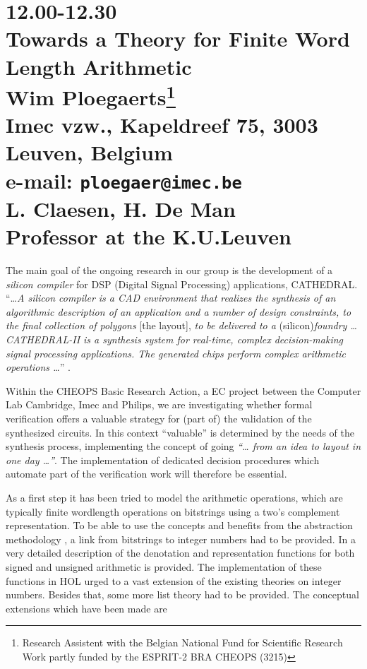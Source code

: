 \newpage
\section*{12.00-12.30\\
Towards a Theory for Finite Word Length Arithmetic\\
Wim Ploegaerts\footnote{Research Assistent with the Belgian National Fund for  
            Scientific Research
            \newline Work partly funded by the ESPRIT-2 BRA CHEOPS (3215)}\\
{\large\bf Imec vzw., Kapeldreef 75, 3003 Leuven, Belgium} \\
{\normalsize\bf e-mail: {\tt ploegaer@imec.be }}\\     
L. Claesen, H. De Man\\
\large\bf Professor at the K.U.Leuven}



The main goal of the ongoing research in our group is the development
of a {\em silicon compiler} for DSP (Digital Signal Processing) applications,
CATHEDRAL.
``\ldots {\em A silicon compiler is a 
CAD environment that realizes the synthesis
of an algorithmic description of an application and a number of design
constraints, to the final collection of polygons} [the layout], {\em to be
delivered to a} (silicon){\em  foundry \ldots CATHEDRAL-II is a synthesis
system for real-time, complex decision-making signal processing applications.
The generated chips perform complex arithmetic operations \ldots}'' \cite{ivo}.

Within the CHEOPS Basic Research Action, a EC project
between the Computer Lab Cambridge, Imec and Philips,
we are investigating whether formal verification
offers a valuable strategy for (part of) the validation of the synthesized
circuits. In this context ``valuable'' is determined by the needs of 
the synthesis process, implementing the concept of going {\em ``\dots 
from an idea to layout in one day \ldots''}. The implementation of
dedicated decision procedures which automate part of the verification
work will therefore be essential. 

As a first step it has been tried to model the arithmetic operations, which
are typically finite wordlength operations on bitstrings using a two's
complement representation. To be able to use the concepts and benefits 
from the abstraction methodology \cite{tom}, a link from bitstrings to integer 
numbers had to be provided. In \cite{raymond} a very detailed description of
the denotation and representation functions for both signed and unsigned
arithmetic is provided. The implementation of these functions in HOL urged to
a vast extension of the existing theories on integer numbers. Besides that,
some more list theory had to be provided.
The conceptual extensions which have been made are

